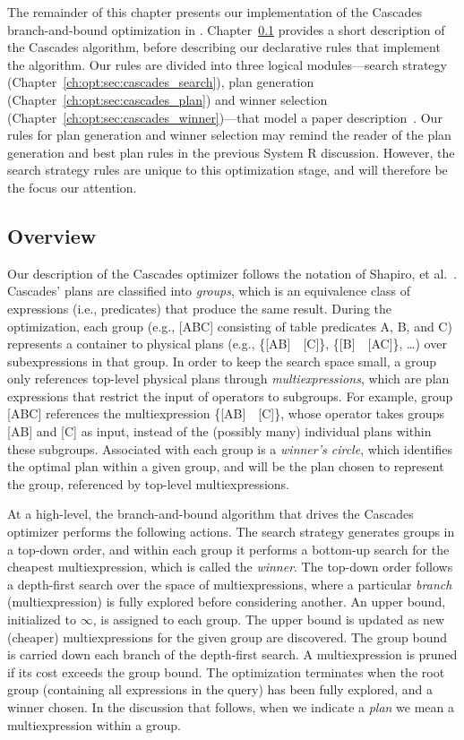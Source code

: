 The remainder of this chapter presents our implementation of the Cascades
branch-and-bound optimization in \OVERLOG.  Chapter~\ref{ch:opt:sec:overview}
provides a short description of the Cascades algorithm, before describing our
declarative rules that implement the algorithm.  Our rules are divided into
three logical modules---search strategy
(Chapter~\ref{ch:opt:sec:cascades_search}), plan generation
(Chapter~\ref{ch:opt:sec:cascades_plan}) and winner selection
(Chapter~\ref{ch:opt:sec:cascades_winner})---that model a paper
description~\cite{Shapiro-opt}.  Our rules for plan generation and winner
selection may remind the reader of the plan generation and best plan rules in
the previous System R discussion.  However, the search strategy rules are
unique to this optimization stage, and will therefore be the focus our
attention.

\subsection{Overview}
\label{ch:opt:sec:overview}

Our description of the Cascades optimizer follows the notation of Shapiro, et
al.~\cite{Shapiro-opt}.  Cascades' plans are classified into {\em groups},
which is an equivalence class of expressions (i.e., predicates) that produce
the same result.  During the optimization, each group (e.g., [ABC] consisting
of table predicates A, B, and C) represents a container to physical plans
(e.g., \{[AB]~~[C]\}, \{[B]~~[AC]\},
\ldots) over subexpressions in that group.  In order to keep the search space
small, a group only references top-level physical plans through {\em
multiexpressions}, which are plan expressions that restrict the input of
operators to subgroups.  For example, group [ABC] references the
multiexpression \{[AB]~~[C]\}, whose 
operator takes groups [AB] and [C] as input, instead of the (possibly many)
individual plans within these subgroups.
Associated with each group is a {\em winner's circle}, which identifies the
optimal plan within a given group, and will be the plan chosen to represent the
group, referenced by top-level multiexpressions.  

At a high-level, the branch-and-bound algorithm that drives the Cascades
optimizer performs the following actions.  The search strategy generates groups
in a top-down order, and within each group it performs a bottom-up search for
the cheapest multiexpression, which is called the {\em winner}.  The top-down
order follows a depth-first search over the space of multiexpressions, where a
particular {\em branch} (multiexpression) is fully explored before considering
another.  An upper bound, initialized to $\infty$, is assigned to each group.
The upper bound is updated as new (cheaper) multiexpressions for the given
group are discovered.  The group bound is carried down each branch of the
depth-first search.  A multiexpression is pruned if its cost exceeds the group
bound.  The optimization terminates when the root group (containing all
expressions in the query) has been fully explored, and a winner chosen.  In the
discussion that follows, when we indicate a {\em plan} we mean a
multiexpression within a group.

